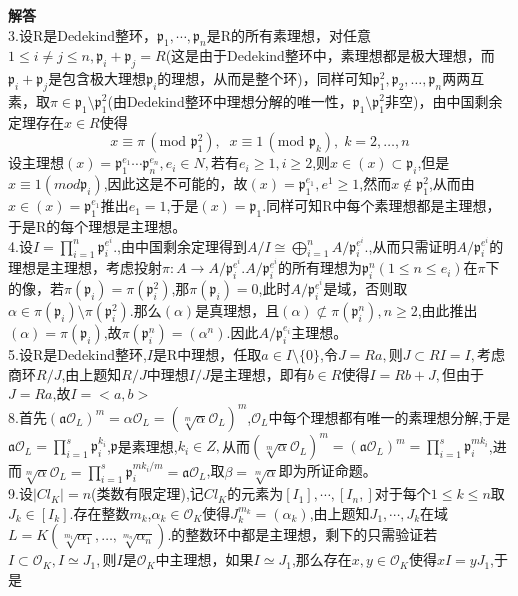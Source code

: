 \documentclass[UTF8]{article}
\begin{document}
    
    \textbf{解答}\\
    3.设R是Dedekind整环，$\mathfrak{p}_{1},\cdots,\mathfrak{p}_{n}$是R的所有素理想，对任意$1\leq i\neq j\leq n,\mathfrak{p}_{i}+\mathfrak{p}_{j}=R$(这是由于Dedekind整环中，素理想都是极大理想，而$\mathfrak{p}_{i}+\mathfrak{p}_{j}$是包含极大理想$\mathfrak{p}_{i}$的理想，从而是整个环)，同样可知$\mathfrak{p}_1^2,\mathfrak{p}_2,\ldots,\mathfrak{p}_n$两两互素，取$\pi \in \mathfrak{p}_{1}\setminus\mathfrak{p}_{1}^{2}$(由Dedekind整环中理想分解的唯一性，$\mathfrak{p}_{1}\setminus\mathfrak{p}_{1}^{2}$非空)，由中国剩余定理存在$x\in R$使得$$x\equiv \pi\,(\textrm{mod } \mathfrak{p}_1^2),\;\; x\equiv 1\,(\textrm{mod } \mathfrak{p}_k),\; k=2,\ldots,n
    $$
    设主理想$(x)=\mathfrak{p}_1^{e_1}\cdots \mathfrak{p}_n^{e_n},e_{i}\in N,$若有$e_{i}\geq 1,i\geq 2$,则$x\in (x)\subset \mathfrak{p}_{i}$,但是$x\equiv 1(mod \mathfrak{p}_{i})$,因此这是不可能的，故$(x)=\mathfrak{p}_{1}^{e_{1}},e^{1}\geq 1$,然而$x\notin\mathfrak{p}_{1}^{2} $,从而由$x\in(x)=\mathfrak{p}_{1}^{e_{1}}$推出$e_{1}=1$,于是$(x)=\mathfrak{p}_{1}.$同样可知R中每个素理想都是主理想，于是R的每个理想是主理想。\\
    4.设$I = \displaystyle\prod_{i =1}^n \mathfrak{p}_i^{e^i}.$,由中国剩余定理得到$A/I \cong \displaystyle\bigoplus_{i =1}^n A/\mathfrak{p}_i^{e^i}.$,从而只需证明$A/\mathfrak{p}_i^{e^i}$的理想是主理想，考虑投射$\pi:A \rightarrow A/\mathfrak{p}_i^{e^i}.$$A/\mathfrak{p}_i^{e^i}$的所有理想为$\mathfrak{p}_{i}^{n}(1\leq n\leq e_{i})$在$\pi$下的像，若$\pi(\mathfrak{p}_{i})=\pi(\mathfrak{p}_{i}^{2})$,那$\pi(\mathfrak{p}_{i})=0$,此时$A/\mathfrak{p}_i^{e^i}$是域，否则取$\alpha \in\pi( \mathfrak{p}_i) \setminus \pi(\mathfrak{p}_i^2).$那么$(\alpha )$是真理想，且$(\alpha) \not\subset \pi(\mathfrak{p}_i^n),n\geq 2$,由此推出$(\alpha)=\pi(\mathfrak{p}_{i})$,故$\pi(\mathfrak{p}_{i}^{n})=(\alpha^{n})$.因此$A/\mathfrak{p}_i^{e_i}$主理想。\\
    5.设R是Dedekind整环,$I$是R中理想，任取$a\in I\setminus\{0\}$,令$J=Ra,$则$J\subset RI=I,$考虑商环$R/J$,由上题知$R/J$中理想$I/J$是主理想，即有$b\in R$使得$I=Rb+J,$但由于$J=Ra$,故$I=<a,b>$\\
    8.首先$(\mathfrak{a}\mathcal{O}_L)^m = \alpha \mathcal{O}_L = (\sqrt[m]{\alpha}\mathcal{O}_L)^m$,$\mathcal{O}_{L}$中每个理想都有唯一的素理想分解,于是$\mathfrak{a}\mathcal{O}_L=\prod_{i=1}^s \mathfrak{p}_i^{k_i}$,$\mathfrak{p}$是素理想,$k_{i}\in Z,$从而$(\sqrt[m]{\alpha}\mathcal{O}_L)^m = (\mathfrak{a}\mathcal{O}_{L})^m = \prod_{i=1}^s \mathfrak{p}_i^{mk_i}$,进而$\sqrt[m]{\alpha}\mathcal{O}_L = \prod_{i=1}^s \mathfrak{p}_i^{mk_i / m} = \mathfrak{a}\mathcal{O}_L$,取$\beta=\sqrt[m]{\alpha}$即为所证命题。\\
    9.设$|Cl_{K}|=n$(类数有限定理),记$Cl_{K}$的元素为$[I_{1}],\cdots,[I_{n},]$对于每个$1\leq k\leq n$取$J_{k}\in [I_{k}].$存在整数$m_{k}$,$\alpha_{k}\in \mathcal{O}_{K}$使得$J_k^{m_k} = (\alpha_k)$,由上题知$J_{1},\cdots,J_{k}$在域$L = K(\sqrt[m_1]{\alpha_1},\ldots, \sqrt[m_n]{\alpha_n}).$的整数环中都是主理想，剩下的只需验证若$I\subset \mathcal{O}_{K},I\simeq J_{1},$则$I$是$\mathcal{O}_{K}$中主理想，如果$I\simeq J_{1}$,那么存在$x,y\in \mathcal{O}_{K}$使得$xI=yJ_{1}$,于是$$
\end{document}
